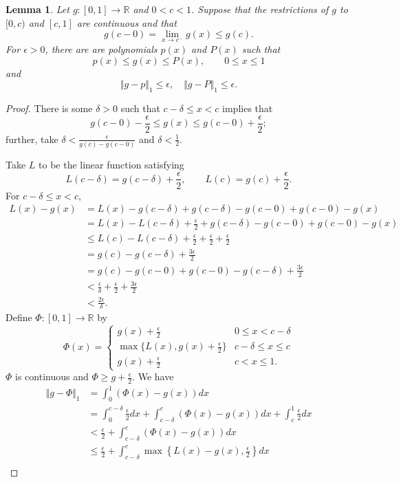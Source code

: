 \documentclass{article}
\newcommand{\norm}[1]{\Vert #1 \Vert}
\newtheorem{lemma}[theorem]{Lemma}
\begin{document}
\begin{lemma}
Let $g:[0,1] \to \mathbb{R}$ and $0<c<1$. Suppose that the restrictions of
$g$ to $[0,c)$ and $[c,1]$ are continuous and that
\[
g(c-0)=\lim_{x \to c^-} g(x) \leq g(c).
\]
For $\epsilon>0$, there are
are polynomials $p(x)$ and $P(x)$ such that
\[
p(x) \leq g(x) \leq P(x), \qquad 0 \leq x \leq 1
\]
and
\[
\norm{g-p}_1 \leq \epsilon, \quad \norm{g-P}_1 \leq \epsilon.
\]
\label{weierstrass}
\end{lemma}
\begin{proof}
There is some $\delta>0$ such that
 $c-\delta \leq x<c$ implies that
\[
g(c-0)-\frac{\epsilon}{2} \leq g(x) \leq g(c-0)+\frac{\epsilon}{2};
\]
further, take $\delta<\frac{\epsilon}{g(c)-g(c-0)}$ and $\delta<\frac{1}{2}$.

Take $L$ to be the linear function satisfying
\[
L(c-\delta) = g(c-\delta)+\frac{\epsilon}{2}, \qquad L(c)=g(c)+\frac{\epsilon}{2}.
\]
For $c-\delta \leq x < c$,
\begin{align*}
L(x)-g(x)&=L(x)-g(c-\delta)+g(c-\delta)-g(c-0)+g(c-0)-g(x)\\
&=L(x)-L(c-\delta)+\frac{\epsilon}{2}+g(c-\delta)-g(c-0)+g(c-0)-g(x)\\
&\leq L(c)-L(c-\delta) +\frac{\epsilon}{2} +\frac{\epsilon}{2}+\frac{\epsilon}{2}\\
&=g(c)-g(c-\delta)+\frac{3\epsilon}{2}\\
&= g(c)-g(c-0)+g(c-0)-g(c-\delta)+\frac{3\epsilon}{2}\\
&<\frac{\epsilon}{\delta}+\frac{\epsilon}{2}+\frac{3\epsilon}{2}\\
&<\frac{2\epsilon}{\delta}.
\end{align*}
Define $\Phi:[0,1] \to \mathbb{R}$ by
\[
\Phi(x)=\begin{cases}
g(x)+\frac{\epsilon}{2}&0 \leq x < c-\delta\\
\max\{L(x),g(x)+\frac{\epsilon}{2}\}&c-\delta \leq x \leq c\\
g(x)+\frac{\epsilon}{2}&c<x \leq 1.
\end{cases}
\]
$\Phi$ is continuous and $\Phi \geq g + \frac{\epsilon}{2}$. 
We have
\begin{align*}
\norm{g-\Phi}_1&=\int_0^1(\Phi(x)-g(x)) dx\\
&=\int_0^{c-\delta} \frac{\epsilon}{2} dx + \int_{c-\delta}^c (\Phi(x)-g(x)) dx
+\int_c^1 \frac{\epsilon}{2} dx\\
&< \frac{\epsilon}{2} + \int_{c-\delta}^c (\Phi(x)-g(x)) dx\\
&\leq \frac{\epsilon}{2}+\int_{c-\delta}^c \max\left\{L(x)-g(x),\frac{\epsilon}{2}\right\} dx\\

\end{align*}
\end{proof}
\end{document}
